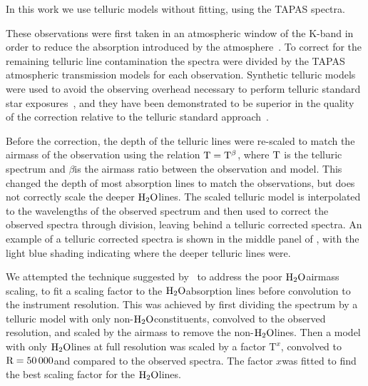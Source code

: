 In this work we use telluric models without fitting, using the TAPAS spectra.

These observations were first taken in an atmospheric window of the K-band in order to reduce the absorption introduced by the atmosphere~\citep{barnes_hd_2008}.
 To correct for the remaining telluric line contamination the spectra were divided by the TAPAS\citep{bertaux_tapas_2014} atmospheric transmission models for each observation. Synthetic telluric models were used to avoid the observing overhead necessary to perform telluric standard star exposures~\citep{vacca_method_2003}, and they have been demonstrated to be superior in the quality of the correction relative to the telluric standard approach~\citep[e.g.][]{cotton_atmospheric_2014}.

Before the correction, the depth of the telluric lines were re-scaled to match the airmass of the observation using the relation \(\rm T = T^{\beta}\), where \(\rm T\) is the telluric spectrum and \(\beta\)is the airmass ratio between the observation and model. This changed the depth of most absorption lines to match the observations, but does not correctly scale the deeper \(\rm H_{2}O\)lines. The scaled telluric model is interpolated to the wavelengths of the observed spectrum and then used to correct the observed spectra through division, leaving behind a telluric corrected spectra. An example of a telluric corrected spectra is shown in the middle panel of , with the light blue shading indicating where the deeper telluric lines were.

We attempted the technique suggested by~\citet{bertaux_tapas_2014} to address the poor \(\rm H_{2}O\)airmass scaling, to fit a scaling factor to the \(\rm {H}_{2}O\)absorption lines before convolution to the instrument resolution. This was achieved by first dividing the spectrum by a telluric model with only non-\(\rm H_{2}O\)constituents, convolved to the observed resolution, and scaled by the airmass to remove the non-\(\rm H_{2}O\)lines. Then a model with only \(\rm H_{2}O\)lines at full resolution was scaled by a factor \(\textrm{T}^{x}\), convolved to \(\rm R=50\,000\)and compared to the observed spectra. The factor \(x\)was fitted to find the best scaling factor for the \(\rm H_{2}O\)lines.

